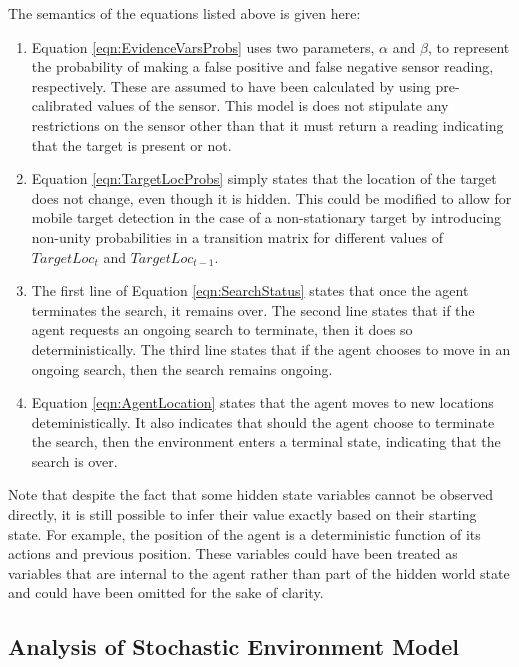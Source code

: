 \normalsize
The semantics of the equations listed above is given here: 
\begin{enumerate}
    \item Equation \ref{eqn:EvidenceVarsProbs} uses two parameters, $\alpha$ and $\beta$, to represent the probability of making a false positive and false negative sensor reading, respectively. These are assumed to have been calculated by using pre-calibrated values of the sensor. This model is does not stipulate any restrictions on the sensor other than that it must return a reading indicating that the target is present or not.
    \item  Equation \ref{eqn:TargetLocProbs} simply states that the location of the target does not change, even though it is hidden. This could be modified to allow for mobile target detection in the case of a non-stationary target by introducing non-unity probabilities in a transition matrix for different values of $TargetLoc_t$ and $TargetLoc_{t-1}$.
    \item The first line of Equation \ref{eqn:SearchStatus} states that once the agent terminates the search, it remains over. The second line states that if the agent requests an ongoing search to terminate, then it does so deterministically. The third line states that if the agent chooses to move in an ongoing search, then the search remains ongoing.
    \item Equation \ref{eqn:AgentLocation} states that the agent moves to new locations deteministically. It also indicates that should the agent choose to terminate the search, then the environment enters a terminal state, indicating that the search is over.
\end{enumerate}


Note that despite the fact that some hidden state variables cannot be observed directly, it is still possible to infer their value exactly based on their starting state. For example, the position of the agent is a deterministic function of its actions and previous position. These variables could have been treated as variables that are internal to the agent rather than part of the hidden world state and could have been omitted for the sake of clarity.


\subsection{Analysis of Stochastic Environment Model}
